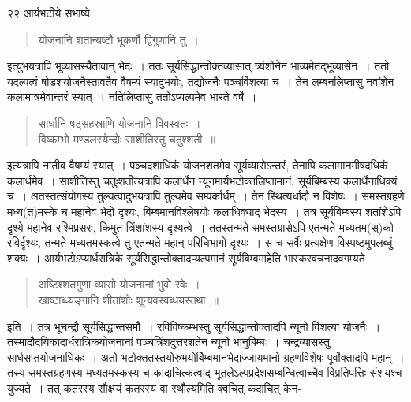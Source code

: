 \documentclass[11pt, openany]{book}
\begin{document}
{\newpage

\vspace{3cm} २२\hspace{4cm} आर्यभटीये सभाष्ये 

\begin{quote}
{\qt योजनानि शतान्यष्टौ भूकर्णौ द्विगुणानि तु~।}
\end{quote} 

 इत्युभयत्रापि भूव्यासस्यैतावान् भेदः~। ततः सूर्यसिद्धान्तोक्तव्यासात् त्र्यंशोनेन भाव्यमेतद्भूव्यासेन~। ततो यदल्पत्वं षोडशयोजनैस्तावतैव वैषम्यं स्यादुभयोः, तद्योजनैः पञ्चविंशत्या च~। तेन लम्बनलिप्तासु नवांशेन कलामात्रमेवान्तरं स्यात्~। नतिलिप्तासु ततोऽप्यल्पमेव भारते वर्षे~।

\begin{quote}
{\qt सार्धानि षट्सहस्राणि योजनानि विवस्वतः~।\\
विष्कम्भो मण्डलस्येन्दोः साशीतिस्तु चतुश्शती~॥}
\end{quote}

 इत्यत्रापि नातीव वैषम्यं स्यात्~। पञ्चदशाधिकं योजनशतमेव सूर्यव्यासेऽन्तरं, तेनापि कलामानमीषदधिकं कलार्धमेव~। साशीतिस्तु चतुःशतीत्यत्रापि कलार्धेन न्यूनमार्यभटोक्तलिप्तामानं, सूर्यबिम्बस्य कलार्धेनाधिक्यं च~। अतस्तत्संयोगस्य तुल्यत्वादुभयत्रापि तुल्यमेव सम्पर्कार्धम्~। तेन स्थित्यर्धादौ न विशेषः~। समस्तग्रहणे मध्य(त)मस्के च
महानेव भेदो दृश्यः, बिम्बमानविश्लेषयोः कलाधिक्याद् भेदस्य~। तत्र सूर्यबिम्बस्य शतांशेऽपि दृश्ये महानेव रश्मिप्रसरः, किमुत त्रिंशांशस्य दृश्यत्वे~। ततस्तन्मते समस्तग्रासेऽपि एतन्मते मध्यतम(स्)को रविर्दृश्यः, तन्मते मध्यतमस्कत्वे तु एतन्मते महान् परिधिभागो दृश्यः~। स च सर्वैः प्रत्यक्षेण विस्पष्टमुपलब्धुं शक्यः~। आर्यभटोऽप्यार्धरात्रिके सूर्यसिद्धान्तोक्तादप्यल्पमानं सूर्यबिम्बमाहेति भास्करवचनादवगम्यते\textendash

\begin{quote}
{\qt अष्टिश्शतगुणा व्यासो योजनानां भुवो रवेः~।\\
खाष्टाब्ध्यङ्गानि शीतांशोः शून्यवस्वब्धयस्तथा~॥}
\end{quote}

\noindent इति~। तत्र भूचन्द्रौ सूर्यसिद्धान्तसमौ~। रविविष्कम्भस्तु सूर्यसिद्धान्तोक्तादपि न्यूनो विंशत्या योजनैः~। तस्मादौदयिकादार्धरात्रिकयोजनानां पञ्चत्रिंशदुत्तरशतेन न्यूनो भानुबिम्बः~। चन्द्रव्यासस्तु सार्धसप्तयोजनाधिकः~। अतो भटोक्ततस्तयोरुभयोर्बिम्बमानभेदाज्जायमानो ग्रहणविशेषः पूर्वोक्तादपि महान्~। तस्य समस्तग्रहणस्य मध्यतमस्कस्य च कादाचित्कत्वाद् भूतलेऽल्पप्रदेशसम्बन्धित्वाच्चैव विप्रतिपत्तिः संशयश्च युज्यते~। तत् कतरस्य सौक्ष्म्यं कतरस्य वा स्थौल्यमिति क्वचित् कदाचित् केन-

}
\end{document}
